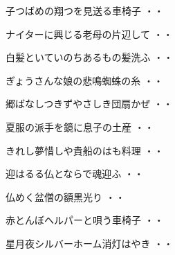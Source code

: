 \begin{shiika}子つばめの翔つを見送る車椅子
\hfill{・・}\end{shiika}
\vspace{0.6cm}
\begin{shiika}ナイターに興じる老母の片辺して
\hfill{・・}\end{shiika}
\vspace{0.6cm}
\begin{shiika}白髪といていのちあるもの髪洗ふ
\hfill{・・}\end{shiika}
\vspace{0.6cm}
\begin{shiika}ぎょうさんな娘の悲鳴蜘蛛の糸
\hfill{・・}\end{shiika}
\vspace{0.6cm}
\begin{shiika}郷ばなしつきずやさしき団扇かぜ
\hfill{・・}\end{shiika}
\vspace{0.6cm}
\begin{shiika}夏服の派手を鏡に息子の土産
\hfill{・・}\end{shiika}
\vspace{0.6cm}
\begin{shiika}きれし夢惜しや貴船のはも料理
\hfill{・・}\end{shiika}
\vspace{0.6cm}
\begin{shiika}迎はるる仏とならで魂迎ふ
\hfill{・・}\end{shiika}
\vspace{0.6cm}
\begin{shiika}仏めく盆僧の額黒光り
\hfill{・・}\end{shiika}
\vspace{0.6cm}
\begin{shiika}赤とんぼヘルパーと唄う車椅子
\hfill{・・}\end{shiika}
\vspace{0.6cm}
\begin{shiika}星月夜シルバーホーム消灯はやき
\hfill{・・}\end{shiika}
\vspace{0.6cm}

